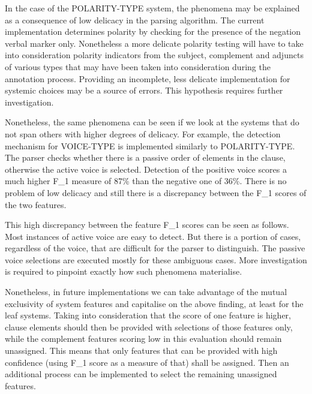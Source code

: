     In the case of the POLARITY-TYPE system, the phenomena may be explained as a consequence of low delicacy in the parsing algorithm. The current implementation determines polarity by checking for the presence of the negation verbal marker only. Nonetheless a more delicate polarity testing will have to take into consideration polarity indicators from the subject, complement and adjuncts of various types that may have been taken into consideration during the annotation process. Providing an incomplete, less delicate implementation for systemic choices may be a source of errors. This hypothesis requires further investigation.  %

    Nonetheless, the same phenomena can be seen if we look at the systems that do not span others with higher degrees of delicacy. For example, the detection mechanism for VOICE-TYPE is implemented similarly to POLARITY-TYPE. The parser checks whether there is a passive order of elements in the clause, otherwise the active voice is selected.  Detection of the positive voice scores a much higher F_1 measure of 87\% than the negative one of 36\%. There is no problem of low delicacy and still there is a discrepancy between the F_1 scores of the two features. %

    This high discrepancy between the feature F_1 scores can be seen as follows. Most instances of active voice are easy to detect. But there is a portion of cases, regardless of the voice, that are difficult for the parser to distinguish. The passive voice selections are executed mostly for these ambiguous cases. More investigation is required to pinpoint exactly how such phenomena materialise.

    Nonetheless, in future implementations we can take advantage of the mutual exclusivity of system features and capitalise on the above finding, at least for the leaf systems. Taking into consideration that the score of one feature is higher, clause elements should then be provided with selections of those features only, while the complement features scoring low in this evaluation should remain unassigned. This means that only features that can be provided with high confidence (using F_1 score as a measure of that) shall be assigned. Then an additional process can be implemented to select the remaining unassigned features. 

